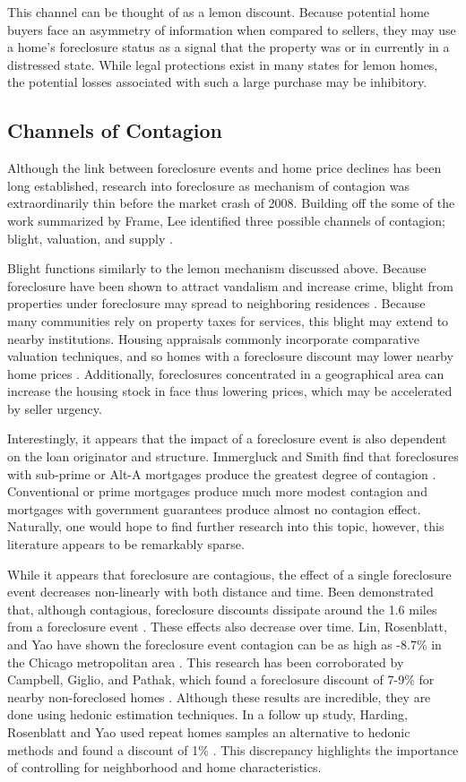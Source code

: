 \documentclass[12pt,oneside]{amsbook}
\begin{document}
This channel can be thought of as a lemon discount. Because potential home buyers face an asymmetry of information when compared to sellers, they may use a home’s foreclosure status as a signal that the property was or in currently in a distressed state. While legal protections exist in many states for lemon homes, the potential losses associated with such a large purchase may be inhibitory. 

\subsection{Channels of Contagion}
Although the link between foreclosure events and home price declines has been long established, research into foreclosure as mechanism of contagion was extraordinarily thin before the market crash of 2008. Building off the some of the work summarized by Frame, Lee identified three possible channels of contagion; blight, valuation, and supply \cite{Lee}. 

	Blight functions similarly to the lemon mechanism discussed above. Because foreclosure have been shown to attract vandalism and increase crime, blight from properties under foreclosure may spread to neighboring residences \cite{Crime}. Because many communities rely on property taxes for services, this blight may extend to nearby institutions. Housing appraisals commonly incorporate comparative valuation techniques, and so homes with a foreclosure discount may lower nearby home prices \cite{Lee}. Additionally, foreclosures concentrated in a geographical area can increase the housing stock in face thus lowering prices, which may be accelerated by seller urgency.  
	
Interestingly, it appears that the impact of a foreclosure event is also dependent on the loan originator and structure. Immergluck and Smith find that foreclosures with sub-prime or Alt-A mortgages produce the greatest degree of contagion \cite{Immer}. Conventional or prime mortgages produce much more modest contagion and mortgages with government guarantees produce almost no contagion effect. Naturally, one would hope to find further research into this topic, however, this literature appears to be remarkably sparse.

	While it appears that foreclosure are contagious, the effect of a single foreclosure event decreases non-linearly with both distance and time. Been demonstrated that, although contagious, foreclosure discounts dissipate around the 1.6 miles from a foreclosure event \cite{Been}. These effects also decrease over time. Lin, Rosenblatt, and Yao have shown the foreclosure event contagion can be as high as -8.7\% in the Chicago metropolitan area \cite{Spillover}. This research has been corroborated by Campbell, Giglio, and Pathak, which found a foreclosure discount of 7-9\% for nearby non-foreclosed homes \cite{Forces}. Although these results are incredible, they are done using hedonic estimation techniques. In a follow up study, Harding, Rosenblatt and Yao used repeat homes samples an alternative to hedonic methods and found a discount of 1\% \cite{Chi}. This discrepancy highlights the importance of controlling for neighborhood and home characteristics. 
	
\end{document}
